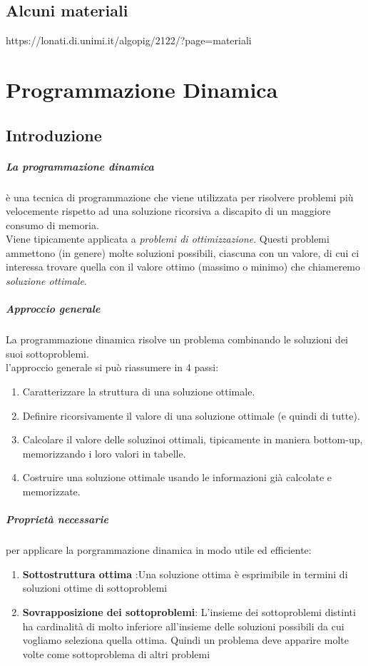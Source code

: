 \documentclass[12pt, a4paper, openany]{book}
\begin{document}
\section*{Alcuni materiali}
https://lonati.di.unimi.it/algopig/2122/?page=materiali

\chapter{Programmazione Dinamica}
\section{Introduzione}
\paragraph{La programmazione dinamica} è una tecnica di programmazione che viene utilizzata per risolvere problemi più velocemente rispetto ad una soluzione ricorsiva a discapito di un maggiore consumo di memoria.
\\Viene tipicamente applicata a \emph{problemi di ottimizzazione}. Questi problemi ammettono (in genere) molte soluzioni possibili, ciascuna con un valore, di cui ci interessa trovare quella con il valore ottimo (massimo o minimo) che chiameremo \emph{soluzione ottimale}.

\paragraph{Approccio generale}
La programmazione dinamica risolve un problema combinando le soluzioni dei suoi sottoproblemi.\\
l'approccio generale si può riassumere in 4 passi:
\begin{enumerate}
	\item Caratterizzare la struttura di una soluzione ottimale.
	\item Definire ricorsivamente il valore di una soluzione ottimale (e quindi di tutte).
	\item Calcolare il valore delle soluzinoi ottimali, tipicamente in maniera bottom-up,
	memorizzando i loro valori in tabelle.
	\item Costruire una soluzione ottimale usando le informazioni già calcolate e memorizzate.
\end{enumerate}

\paragraph{Proprietà necessarie} per applicare la porgrammazione dinamica in modo utile ed efficiente:
\begin{enumerate}
	\item \textbf{Sottostruttura ottima} :Una soluzione ottima è esprimibile in termini di soluzioni ottime di sottoproblemi
	\item \textbf{Sovrapposizione dei sottoproblemi}: L'insieme dei sottoproblemi distinti ha cardinalità di molto inferiore all'insieme delle soluzioni possibili da cui vogliamo seleziona quella ottima. Quindi un problema deve apparire molte volte come sottoproblema di altri problemi
\end{enumerate}
\end{document}
